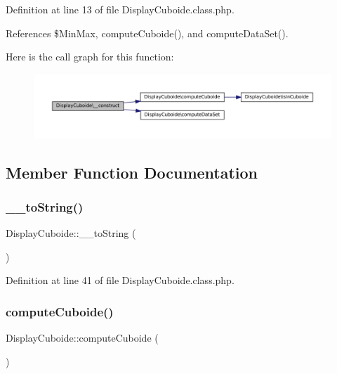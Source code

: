 Definition at line 13 of file Display\+Cuboide.\+class.\+php.



References \$\+Min\+Max, compute\+Cuboide(), and compute\+Data\+Set().

Here is the call graph for this function\+:\nopagebreak
\begin{figure}[H]
\begin{center}
\leavevmode
\includegraphics[width=350pt]{class_display_cuboide_a9e65582b70a5c17de4ce9ad3ee7f51cd_cgraph}
\end{center}
\end{figure}


\subsection{Member Function Documentation}
\mbox{\label{class_display_cuboide_a052175949aadbfd62fccceb3ecfdfd9e}} 
\subsubsection{\texorpdfstring{\+\_\+\+\_\+to\+String()}{\_\_toString()}}
{\footnotesize\ttfamily Display\+Cuboide\+::\+\_\+\+\_\+to\+String (\begin{DoxyParamCaption}{ }\end{DoxyParamCaption})}



Definition at line 41 of file Display\+Cuboide.\+class.\+php.

\mbox{\label{class_display_cuboide_ade706d53e065cd76a38c2e998d36f81c}} 
\subsubsection{\texorpdfstring{compute\+Cuboide()}{computeCuboide()}}
{\footnotesize\ttfamily Display\+Cuboide\+::compute\+Cuboide (\begin{DoxyParamCaption}{ }\end{DoxyParamCaption})\hspace{0.3cm}{\ttfamily [protected]}}



